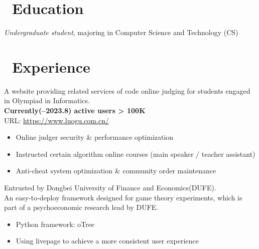 \documentclass{resume}
\begin{document}



\section{\faGraduationCap\ Education}
\textit{Undergraduate student}, majoring in Computer Science and Technology (CS)

\section{\faUsers\ Experience}
A website providing related services of code online judging for students engaged in Olympiad in Informatics. \\
\textbf{Currently(--2023.8) active users > 100K} \\
URL: \href{https://www.luogu.com.cn/}{https://www.luogu.com.cn/}
\begin{itemize}
  \item Online judger security \& performance optimization
  \item Instructed certain algorithm online courses (main speaker / teacher assistant)
  \item Anti-cheat system optimization \& community order maintenance
\end{itemize}

Entrusted by Dongbei University of Finance and Economics(DUFE). \\
An easy-to-deploy framework designed for game theory experiments, which is part of a psychoeconomic research lead by DUFE.
\begin{itemize}
  \item Python framework: oTree
  \item Using livepage to achieve a more consistent user experience
\end{itemize}
\end{document}
